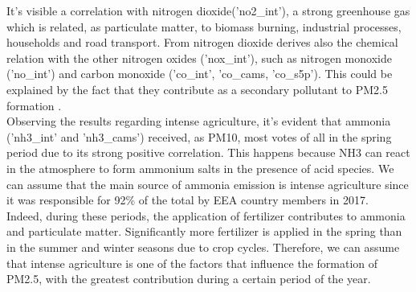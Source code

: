 It's visible a correlation with nitrogen dioxide('no2\_int'), a strong greenhouse gas which is related, as particulate matter, to biomass burning, industrial processes, households and road transport\cite{zellner2000john}\cite{maranzano2022air}.
From nitrogen dioxide derives also the chemical relation with the other nitrogen oxides ('nox\_int'), such as nitrogen monoxide ('no\_int') and carbon monoxide ('co\_int', 'co\_cams, 'co\_s5p'). This could be explained by the fact that they contribute as a secondary pollutant to PM2.5 formation \cite{xie2015spatiotemporal}.
\\
Observing the results regarding intense agriculture, it's evident that ammonia ('nh3\_int' and 'nh3\_cams') received, as PM10, most votes of all in the spring period due to its strong positive correlation. 
This happens because NH3 can react in the atmosphere to form ammonium salts in the presence of acid species\cite{viatte2021ammonia}.
We can assume that the main source of ammonia emission is intense agriculture since it was responsible for 92\% of the total by EEA country members in 2017\cite{maranzano2022air}.\\
Indeed, during these periods, the application of fertilizer contributes to ammonia and particulate matter.
Significantly more fertilizer is applied in the spring than in the summer and winter seasons due to crop cycles\cite{goebes2003ammonia}.
Therefore, we can assume that intense agriculture is one of the factors that influence the formation of PM2.5, with the greatest contribution during a certain period of the year.
